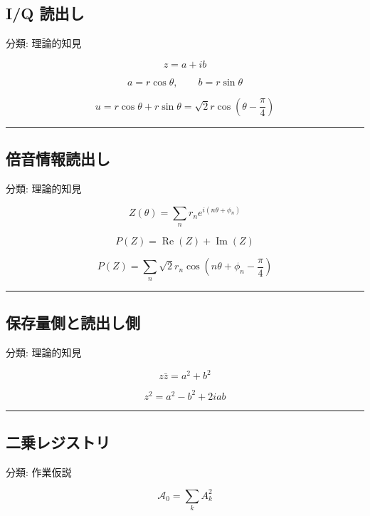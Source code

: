 \documentclass[
  a4paper,
]{ltjsarticle}
\begin{document}
\subsection{I/Q 読出し}\label{iq-ux8aadux51faux3057}

分類: 理論的知見

\[
z=a+ib
\]

\[
a=r\cos\theta,\qquad b=r\sin\theta
\]

\[
u=r\cos\theta+r\sin\theta
=\sqrt2 r\cos\left(\theta-\frac{\pi}{4}\right)
\]

\begin{center}\rule{0.5\linewidth}{0.5pt}\end{center}

\subsection{倍音情報読出し}\label{ux500dux97f3ux60c5ux5831ux8aadux51faux3057}

分類: 理論的知見

\[
Z(\theta)=\sum_n r_n e^{i(n\theta+\phi_n)}
\]

\[
P(Z)=\operatorname{Re}(Z)+\operatorname{Im}(Z)
\]

\[
P(Z)=\sum_n \sqrt2 r_n
\cos\left(n\theta+\phi_n-\frac{\pi}{4}\right)
\]

\begin{center}\rule{0.5\linewidth}{0.5pt}\end{center}

\subsection{保存量側と読出し側}\label{ux4fddux5b58ux91cfux5074ux3068ux8aadux51faux3057ux5074}

分類: 理論的知見

\[
z\bar z=a^2+b^2
\]

\[
z^2=a^2-b^2+2iab
\]

\begin{center}\rule{0.5\linewidth}{0.5pt}\end{center}

\subsection{二乗レジストリ}\label{ux4e8cux4e57ux30ecux30b8ux30b9ux30c8ux30ea}

分類: 作業仮説

\[
\mathcal{A}_0=\sum_k A_k^2
\]
\end{document}
